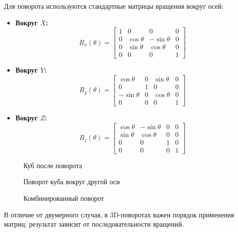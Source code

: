 Для поворота используются стандартные матрицы вращения вокруг осей:
\begin{itemize}
    \item \textbf{Вокруг $X$:}
    \[
    R_x(\theta) = \begin{bmatrix}
        1 & 0 & 0 & 0 \\
        0 & \cos\theta & -\sin\theta & 0 \\
        0 & \sin\theta & \cos\theta & 0 \\
        0 & 0 & 0 & 1
    \end{bmatrix}
    \]
    \item \textbf{Вокруг $Y$:}
    \[
    R_y(\theta) = \begin{bmatrix}
        \cos\theta & 0 & \sin\theta & 0 \\
        0 & 1 & 0 & 0 \\
        -\sin\theta & 0 & \cos\theta & 0 \\
        0 & 0 & 0 & 1
    \end{bmatrix}
    \]
    \item \textbf{Вокруг $Z$:}
    \[
    R_z(\theta) = \begin{bmatrix}
        \cos\theta & -\sin\theta & 0 & 0 \\
        \sin\theta & \cos\theta & 0 & 0 \\
        0 & 0 & 1 & 0 \\
        0 & 0 & 0 & 1
    \end{bmatrix}
    \]
\end{itemize}

\begin{figure}[h!]
    \centering
    \caption{Куб после поворота}
\end{figure}

\begin{figure}[h!]
    \centering
    \caption{Поворот куба вокруг другой оси}
\end{figure}

\begin{figure}[h!]
    \centering
    \caption{Комбинированный поворот}
\end{figure}

В отличие от двумерного случая, в 3D-поворотах важен порядок применения матриц: результат зависит от последовательности вращений.

